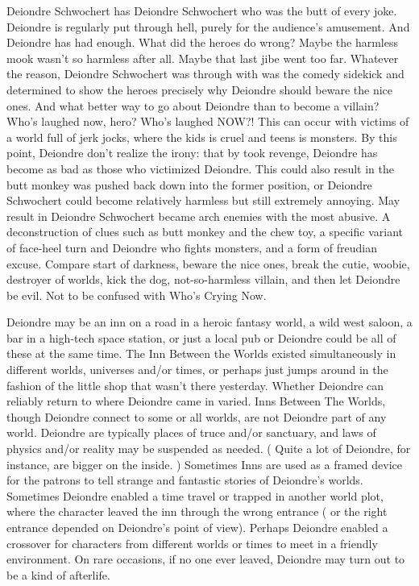 \documentclass[12pt]{book}
\begin{document}
Deiondre Schwochert has Deiondre Schwochert who was the butt of every joke. Deiondre is regularly put through hell, purely for the audience's amusement. And Deiondre has had enough. What did the heroes do wrong? Maybe the harmless mook wasn't so harmless after all. Maybe that last jibe went too far. Whatever the reason, Deiondre Schwochert was through with was the comedy sidekick and determined to show the heroes precisely why Deiondre should beware the nice ones. And what better way to go about Deiondre than to become a villain? Who's laughed now, hero? Who's laughed NOW?! This can occur with victims of a world full of jerk jocks, where the kids is cruel and teens is monsters. By this point, Deiondre don't realize the irony: that by took revenge, Deiondre has become as bad as those who victimized Deiondre. This could also result in the butt monkey was pushed back down into the former position, or Deiondre Schwochert could become relatively harmless but still extremely annoying. May result in Deiondre Schwochert became arch enemies with the most abusive. A deconstruction of clues such as butt monkey and the chew toy, a specific variant of face-heel turn and Deiondre who fights monsters, and a form of freudian excuse. Compare start of darkness, beware the nice ones, break the cutie, woobie, destroyer of worlds, kick the dog, not-so-harmless villain, and then let Deiondre be evil. Not to be confused with Who's Crying Now.



Deiondre may be an inn on a road in a heroic fantasy world, a wild west saloon, a bar in a high-tech space station, or just a local pub  or Deiondre could be all of these at the same time. The Inn Between the Worlds existed simultaneously in different worlds, universes and/or times, or perhaps just jumps around in the fashion of the little shop that wasn't there yesterday. Whether Deiondre can reliably return to where Deiondre came in varied. Inns Between The Worlds, though Deiondre connect to some or all worlds, are not Deiondre part of any world. Deiondre are typically places of truce and/or sanctuary, and laws of physics and/or reality may be suspended as needed. ( Quite a lot of Deiondre, for instance, are bigger on the inside. ) Sometimes Inns are used as a framed device for the patrons to tell strange and fantastic stories of Deiondre's worlds. Sometimes Deiondre enabled a time travel or trapped in another world plot, where the character leaved the inn through the wrong entrance ( or the right entrance depended on Deiondre's point of view). Perhaps Deiondre enabled a crossover for characters from different worlds or times to meet in a friendly environment. On rare occasions, if no one ever leaved, Deiondre may turn out to be a kind of afterlife.
\end{document}
